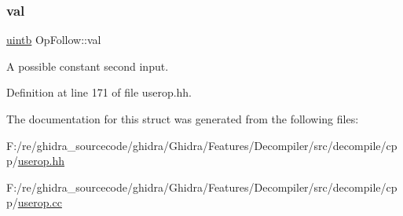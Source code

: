 \subsubsection{\texorpdfstring{val}{val}}
{\footnotesize\ttfamily \mbox{\hyperlink{types_8h_a2db313c5d32a12b01d26ac9b3bca178f}{uintb}} Op\+Follow\+::val}



A possible constant second input. 



Definition at line 171 of file userop.\+hh.



The documentation for this struct was generated from the following files\+:\begin{DoxyCompactItemize}
\item 
F\+:/re/ghidra\+\_\+sourcecode/ghidra/\+Ghidra/\+Features/\+Decompiler/src/decompile/cpp/\mbox{\hyperlink{userop_8hh}{userop.\+hh}}\item 
F\+:/re/ghidra\+\_\+sourcecode/ghidra/\+Ghidra/\+Features/\+Decompiler/src/decompile/cpp/\mbox{\hyperlink{userop_8cc}{userop.\+cc}}\end{DoxyCompactItemize}
